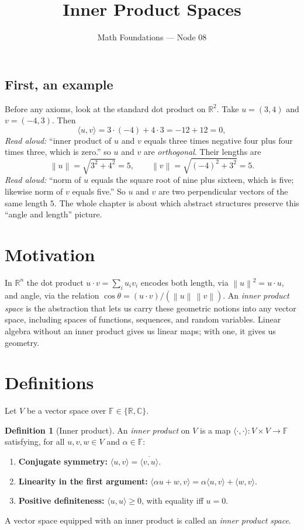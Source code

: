 \documentclass[11pt]{article}
\title{Inner Product Spaces}
\author{Math Foundations --- Node 08}
\date{}
\theoremstyle{definition}
\newtheorem{definition}[theorem]{Definition}
\newcommand{\inner}[2]{\langle #1, #2 \rangle}
\newcommand{\norm}[1]{\left\| #1 \right\|}
\newcommand{\R}{\mathbb{R}}
\newcommand{\C}{\mathbb{C}}
\newcommand{\F}{\mathbb{F}}
\begin{document}
\maketitle

\subsection*{First, an example}

Before any axioms, look at the standard dot product on $\R^2$. Take
$u = (3, 4)$ and $v = (-4, 3)$. Then
$$\inner{u}{v} = 3 \cdot (-4) + 4 \cdot 3 = -12 + 12 = 0,$$
\emph{Read aloud:} ``inner product of $u$ and $v$ equals three times negative four plus four times three, which is zero.''
so $u$ and $v$ are \emph{orthogonal}. Their lengths are
$$\norm{u} = \sqrt{3^2 + 4^2} = 5, \qquad \norm{v} = \sqrt{(-4)^2 + 3^2} = 5.$$
\emph{Read aloud:} ``norm of $u$ equals the square root of nine plus sixteen, which is five; likewise norm of $v$ equals five.''
So $u$ and $v$ are two perpendicular vectors of the same length $5$.
The whole chapter is about which abstract structures preserve this
``angle and length'' picture.

\section{Motivation}

In $\R^n$ the dot product $u \cdot v = \sum_i u_i v_i$ encodes both
length, via $\norm{u}^2 = u \cdot u$, and angle, via the relation
$\cos\theta = (u \cdot v)/(\norm{u}\,\norm{v})$. An \emph{inner product
space} is the abstraction that lets us carry these geometric notions
into any vector space, including spaces of functions, sequences, and
random variables. Linear algebra without an inner product gives us
linear maps; with one, it gives us geometry.

\section{Definitions}

Let $V$ be a vector space over $\F \in \{\R, \C\}$.

\begin{definition}[Inner product]
An \emph{inner product} on $V$ is a map
$\inner{\cdot}{\cdot} : V \times V \to \F$ satisfying, for all
$u, v, w \in V$ and $\alpha \in \F$:
\begin{enumerate}
  \item \textbf{Conjugate symmetry:} $\inner{u}{v} = \overline{\inner{v}{u}}$.
  \item \textbf{Linearity in the first argument:}
        $\inner{\alpha u + w}{v} = \alpha \inner{u}{v} + \inner{w}{v}$.
  \item \textbf{Positive definiteness:} $\inner{u}{u} \ge 0$, with
        equality iff $u = 0$.
\end{enumerate}
A vector space equipped with an inner product is called an
\emph{inner product space}.
\end{definition}
\end{document}
